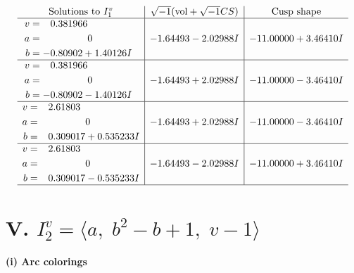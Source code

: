\documentclass[1p]{elsarticle_modified}
\theoremstyle{definition}
\newcommand{\I}{\sqrt{-1}}
\begin{document}
$$\begin{array}{c|c|c}  
\text{Solutions to }I^v_{1}& \I (\text{vol} + \sqrt{-1}CS) & \text{Cusp shape}\\
 \hline 
\begin{aligned}
v &= \phantom{-}0.381966\phantom{ +0.000000I} \\
a &= \phantom{-0.000000 } 0 \\
b &= -0.80902 + 1.40126 I\end{aligned}
 & -1.64493 - 2.02988 I & -11.00000 + 3.46410 I \\ \hline\begin{aligned}
v &= \phantom{-}0.381966\phantom{ +0.000000I} \\
a &= \phantom{-0.000000 } 0 \\
b &= -0.80902 - 1.40126 I\end{aligned}
 & -1.64493 + 2.02988 I & -11.00000 - 3.46410 I \\ \hline\begin{aligned}
v &= \phantom{-}2.61803\phantom{ +0.000000I} \\
a &= \phantom{-0.000000 } 0 \\
b &= \phantom{-}0.309017 + 0.535233 I\end{aligned}
 & -1.64493 + 2.02988 I & -11.00000 - 3.46410 I \\ \hline\begin{aligned}
v &= \phantom{-}2.61803\phantom{ +0.000000I} \\
a &= \phantom{-0.000000 } 0 \\
b &= \phantom{-}0.309017 - 0.535233 I\end{aligned}
 & -1.64493 - 2.02988 I & -11.00000 + 3.46410 I\\
 \hline 
 \end{array}$$\newpage\newpage\renewcommand{\arraystretch}{1}
\centering \section*{V. $I^v_{2}= \langle a,\;b^2- b+1,\;v-1 \rangle$}
\flushleft \textbf{(i) Arc colorings}\\
\end{document}
